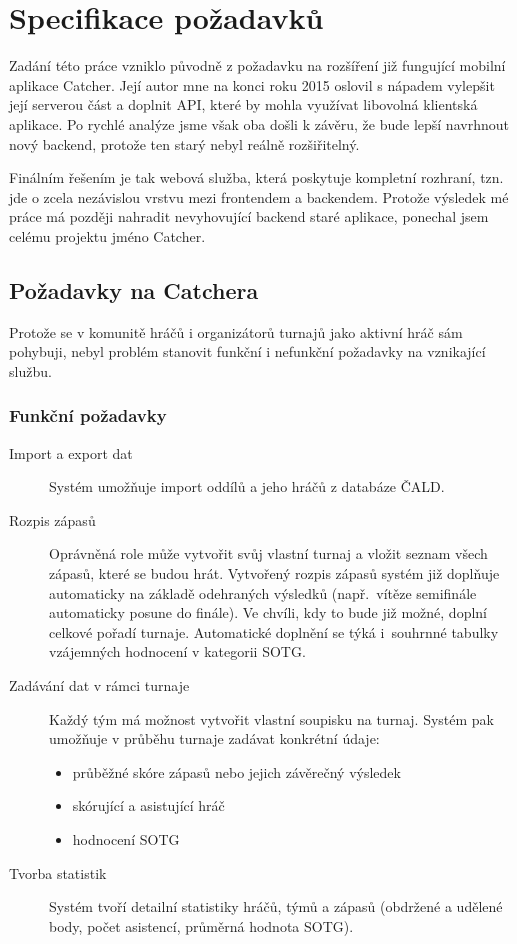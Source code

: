 \chapter{Specifikace požadavků}

Zadání této práce vzniklo původně z požadavku na rozšíření již fungující mobilní aplikace Catcher.
Její autor mne na konci roku 2015 oslovil s nápadem vylepšit její serverou část a doplnit API,
které by mohla využívat libovolná klientská aplikace. Po rychlé analýze jsme však oba došli k závěru,
že bude lepší navrhnout nový backend, protože ten starý nebyl reálně rozšiřitelný. %

Finálním řešením je tak webová služba, která poskytuje kompletní rozhraní,
tzn. jde o zcela nezávislou vrstvu mezi frontendem a backendem.
Protože výsledek mé práce má později nahradit nevyhovující backend staré aplikace, ponechal jsem celému projektu jméno Catcher.

\section{Požadavky na Catchera}

Protože se v komunitě hráčů i organizátorů turnajů jako aktivní hráč sám pohybuji,
nebyl problém stanovit funkční i nefunkční požadavky na vznikající službu.

\subsection{Funkční požadavky}

\begin{description}
  \item[Import a export dat]
    Systém umožňuje import oddílů a jeho hráčů z databáze ČALD.
  \item[Rozpis zápasů]
    Oprávněná role může vytvořit svůj vlastní turnaj a vložit seznam všech zápasů,
    které se budou hrát. Vytvořený rozpis zápasů systém již doplňuje automaticky na základě
    odehraných výsledků (např.~vítěze semifinále automaticky posune do finále). Ve chvíli,
    kdy to bude již možné, doplní celkové pořadí turnaje. Automatické doplnění se
    týká i~souhrnné tabulky vzájemných hodnocení v kategorii SOTG.
  \item[Zadávání dat v rámci turnaje]
    Každý tým má možnost vytvořit vlastní soupisku na turnaj. Systém pak umožňuje
    v průběhu turnaje zadávat konkrétní údaje:
    \begin{itemize}
      \item průběžné skóre zápasů nebo jejich závěrečný výsledek
      \item skórující a asistující hráč
      \item hodnocení SOTG
    \end{itemize}
  \item[Tvorba statistik]
    Systém tvoří detailní statistiky hráčů, týmů a zápasů (obdržené a udělené body,
    počet asistencí, průměrná hodnota SOTG).
\end{description}

